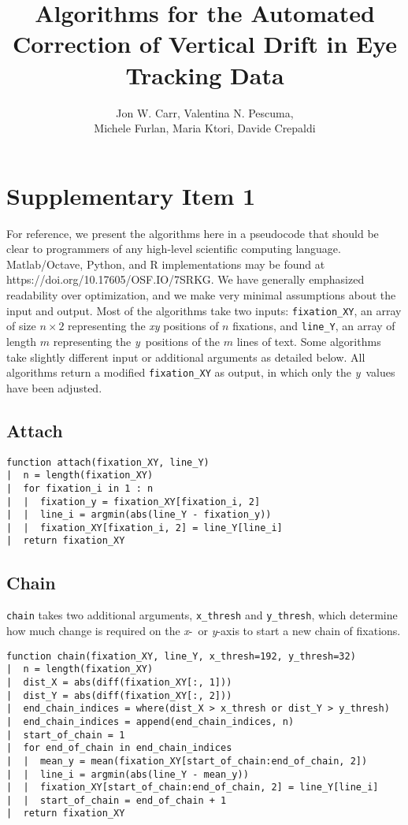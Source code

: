 \documentclass[doc,biblatex]{apa7}
\title{Algorithms for the Automated Correction of Vertical Drift in Eye Tracking Data}
\author{Jon W. Carr, Valentina N. Pescuma,\\Michele Furlan, Maria Ktori, Davide Crepaldi}
\affiliation{Cognitive Neuroscience, International School for Advanced Studies, Trieste, Italy}
\begin{document}
\maketitle

\section{Supplementary Item 1}

\noindent
For reference, we present the algorithms here in a pseudocode that should be clear to programmers of any high-level scientific computing language. Matlab/Octave, Python, and R implementations may be found at https://doi.org/10.17605/OSF.IO/7SRKG. We have generally emphasized readability over optimization, and we make very minimal assumptions about the input and output. Most of the algorithms take two inputs: \texttt{fixation\_XY}, an array of size $n \times 2$ representing the \textit{xy} positions of $n$ fixations, and \texttt{line\_Y}, an array of length $m$ representing the \textit{y}~positions of the $m$ lines of text. Some algorithms take slightly different input or additional arguments as detailed below. All algorithms return a modified \texttt{fixation\_XY} as output, in which only the \textit{y}~values have been adjusted.

\subsection{Attach}

\begin{verbatim}
function attach(fixation_XY, line_Y)
|  n = length(fixation_XY)
|  for fixation_i in 1 : n
|  |  fixation_y = fixation_XY[fixation_i, 2]
|  |  line_i = argmin(abs(line_Y - fixation_y))
|  |  fixation_XY[fixation_i, 2] = line_Y[line_i]
|  return fixation_XY
\end{verbatim}

\subsection{Chain}

\noindent
\texttt{chain} takes two additional arguments, \texttt{x\_thresh} and \texttt{y\_thresh}, which determine how much change is required on the \textit{x}-~or \textit{y}-axis to start a new chain of fixations.

\begin{verbatim}
function chain(fixation_XY, line_Y, x_thresh=192, y_thresh=32)
|  n = length(fixation_XY)
|  dist_X = abs(diff(fixation_XY[:, 1]))
|  dist_Y = abs(diff(fixation_XY[:, 2]))
|  end_chain_indices = where(dist_X > x_thresh or dist_Y > y_thresh)
|  end_chain_indices = append(end_chain_indices, n)
|  start_of_chain = 1
|  for end_of_chain in end_chain_indices
|  |  mean_y = mean(fixation_XY[start_of_chain:end_of_chain, 2])
|  |  line_i = argmin(abs(line_Y - mean_y))
|  |  fixation_XY[start_of_chain:end_of_chain, 2] = line_Y[line_i]
|  |  start_of_chain = end_of_chain + 1
|  return fixation_XY
\end{verbatim}
\end{document}
